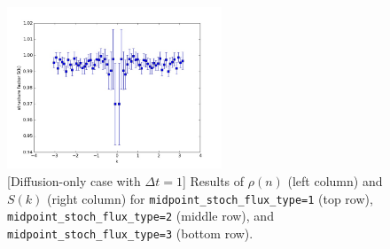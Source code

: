 \documentclass{article}
\begin{document}
\begin{figure}
\includegraphics[width=0.5\linewidth,height=1.9in]{fig1/diff_dt1_Sk_mid3.jpg}
\caption{\label{fig_diff_dt1_mid_type}[Diffusion-only case with $\Delta t=1$] Results of $\rho(n)$ (left column) and $S(k)$ (right column) for \texttt{midpoint\_stoch\_flux\_type=1} (top row), \texttt{midpoint\_stoch\_flux\_type=2} (middle row), and \texttt{midpoint\_stoch\_flux\_type=3} (bottom row).
}
\end{figure}
\end{document}
